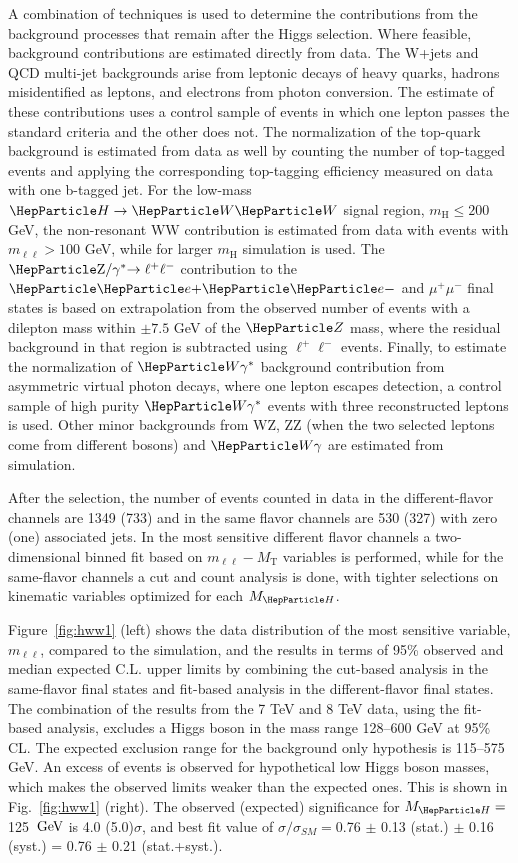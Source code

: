 \documentclass{cimento}
\providecommand{\MT}{\ensuremath{M_{\mathrm{T}}\xspace}}
\newcommand{\mH}{\ensuremath{m_{\mathrm{H}}}\xspace}
\newcommand{\MH}{\ensuremath{M_{\PH}}}
\newcommand{\GeV}{\ensuremath{\,\text{Ge\hspace{-.08em}V}}\xspace}
\newcommand{\cPZ}{\PZ} %
\newcommand{\Lep}{\ensuremath{\mathrm{\ell}}}
\newcommand{\mll}{\ensuremath{m_{\Lep\Lep}}}
\newcommand{\dyll}{\ensuremath{\mathrm{\cPZ}/\gamma^*\mathrm{\to \ell^+\ell^-}}}
\newcommand{\wgamma}{\ensuremath{\PW\gamma}}
\begin{document}
A combination of techniques is used to determine the contributions
from the background processes that remain after the Higgs selection.
Where feasible, background contributions are estimated directly from
data.  The W+jets and QCD multi-jet backgrounds arise from leptonic
decays of heavy quarks, hadrons misidentified as leptons, and
electrons from photon conversion. The estimate of these contributions
uses a control sample of events in which one lepton passes the
standard criteria and the other does not.  The normalization of the
top-quark background is estimated from data as well by counting the
number of top-tagged events and applying the corresponding top-tagging
efficiency measured on data with one b-tagged jet.  For the low-mass
$\PH\to\PW\PW$ signal region, $\mH \leq 200$ GeV, the non-resonant WW
contribution is estimated from data with events with $\mll>100$ GeV,
while for larger $\mH$ simulation is used.  The $\dyll$ contribution
to the $\Pep\Pem$ and $\mu^+\mu^-$ final states is based on
extrapolation from the observed number of events with a dilepton mass
within $\pm7.5$ GeV of the $\cPZ$ mass, where the residual background
in that region is subtracted using $\ell^+\ell^-$ events.  Finally, to
estimate the normalization of $\wgamma^{*}$ background contribution
from asymmetric virtual photon decays, where one lepton escapes
detection, a control sample of high purity $\wgamma^{*}$ events with
three reconstructed leptons is used.  Other minor backgrounds from WZ,
ZZ (when the two selected leptons come from different bosons) and
$\wgamma$ are estimated from simulation.

After the selection, the number of events counted in data in the
different-flavor channels are 1349 (733) and in the same flavor
channels are 530 (327) with zero (one) associated jets. In the most
sensitive different flavor channels a two-dimensional binned fit based
on $\mll-\MT$ variables is performed, while for the same-flavor
channels a cut and count analysis is done, with tighter selections on
kinematic variables optimized for each $\MH$.

Figure~\ref{fig:hww1} (left) shows the data distribution of the most
sensitive variable, $\mll$, compared to the simulation, and the
results in terms of 95\% observed and median expected C.L. upper
limits by combining the cut-based analysis in the same-flavor final
states and fit-based analysis in the different-flavor final states.
The combination of the results from the 7 TeV and 8 TeV data, using
the fit-based analysis, excludes a Higgs boson in the mass range
128--600 GeV at 95\% CL.  The expected exclusion range for the
background only hypothesis is 115--575 GeV.  An excess of events is
observed for hypothetical low Higgs boson masses, which makes the
observed limits weaker than the expected ones. This is shown in
Fig.~\ref{fig:hww1} (right).  The observed (expected) significance for
$\MH=$125 \GeV is 4.0 (5.0)$\sigma$, and best fit value of
$\sigma/\sigma_{SM}=$0.76 $\pm$ 0.13 (stat.) $\pm$ 0.16 (syst.) = 0.76
$\pm$ 0.21 (stat.+syst.).
\end{document}

